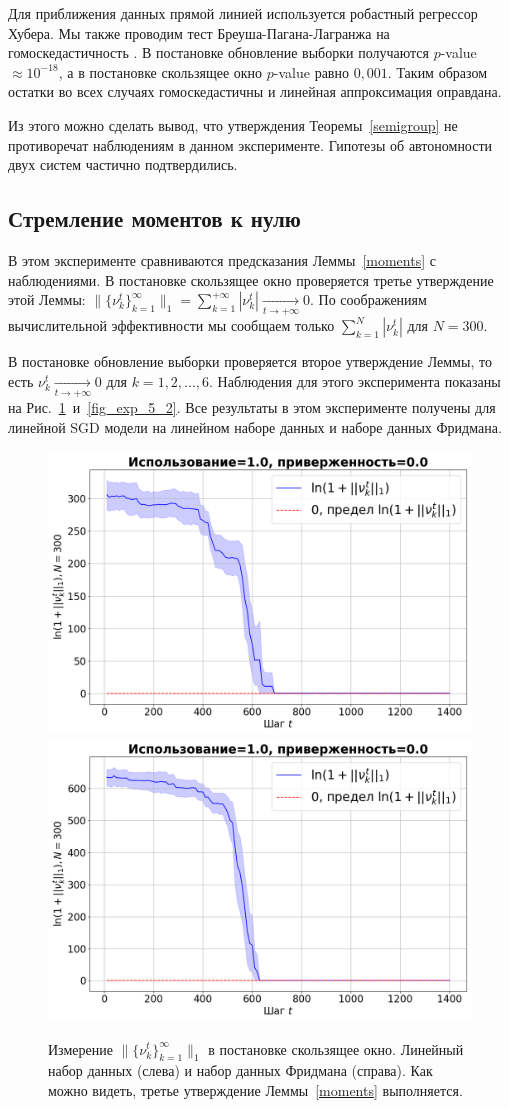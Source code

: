     Для приближения данных прямой линией используется робастный регрессор Хубера. Мы также проводим тест Бреуша-Пагана-Лагранжа на гомоскедастичность \citep{d1971omnibus}. В постановке обновление выборки получаются $p$-value $\approx 10^{-18}$, а в постановке скользящее окно $p$-value равно $0,001$. Таким образом остатки во всех случаях гомоскедастичны и линейная аппроксимация оправдана.

    Из этого можно сделать вывод, что утверждения Теоремы~\ref{semigroup} не противоречат наблюдениям в данном эксперименте. Гипотезы об автономности двух систем частично подтвердились.

\subsection{Стремление моментов к нулю} \label{exp_5}

    В этом эксперименте сравниваются предсказания Леммы~\ref{moments} с наблюдениями. В постановке скользящее окно проверяется третье утверждение этой Леммы: $\|\{\nu_k^t\}_{k=1}^{\infty}\|_1 = \sum_{k=1}^{+\infty} |\nu_k^t| \underset{t \to +\infty}{\longrightarrow} 0$. По соображениям вычислительной эффективности мы сообщаем только $\sum_{k=1}^{N} |\nu_k^t|$ для $N=300$.

    В постановке обновление выборки проверяется второе утверждение Леммы, то есть $\nu_k^t \underset{t \to +\infty}{\longrightarrow} 0$ для $k = 1, 2, ... , 6$. Наблюдения для этого эксперимента показаны на Рис.~\ref{fig_exp_5_1}~и~\ref{fig_exp_5_2}. Все результаты в этом эксперименте получены для линейной SGD модели на линейном наборе данных и наборе данных Фридмана.

    \begin{figure}[h!]
        \centering
        \includegraphics[width=0.49\linewidth]{pictures/k_mom_sw_synthetic_sgd_model_50_1.0_0.0.png}
        \includegraphics[width=0.49\linewidth]{pictures/k_mom_sw_friedman_sgd_model_50_1.0_0.0.png}
        
        \caption{Измерение $\|\{\nu_k^t\}_{k=1}^{\infty}\|_1$ в постановке скользящее окно. Линейный набор данных (слева) и набор данных Фридмана (справа). Как можно видеть, третье утверждение Леммы~\ref{moments} выполняется.}
        \label{fig_exp_5_1}
    \end{figure}

